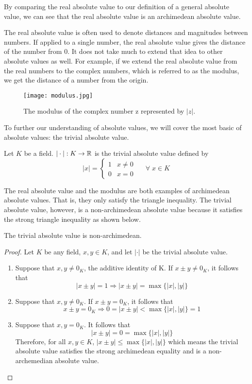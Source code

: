 \documentclass[a4paper]{article}
\begin{document}
By comparing the real absolute value to our definition of a general
absolute value, we can see that the real absolute value is an
archimedean absolute value.

The real absolute value is often used to denote distances 
and magnitudes between numbers.  If applied to a single number, the
real absolute value gives the distance of the number from 0.  
It does not take much to extend
that idea to other absolute values as well.  For example, if we extend
the real absolute value from the real numbers to the
complex numbers, which is referred to as the modulus,
we get the distance of a number from the origin.

\begin{figure}[!h]
  \centering
  \texttt{[image: modulus.jpg]}
  \caption{\label{fig:modulus}The modulus of the complex number z
  represented by \(|z|\).}
\end{figure}

To further our understanding of absolute values, we will cover the most
basic of absolute values: the trivial absolute value.

\begin{definition}
Let \(K\) be a field.  \(|\cdot|:K\to\mathbb R\) is the trivial 
absolute value defined by
\[
  |x|=
  \begin{cases} 
      1 & x\neq 0 \\
      0 & x=0 
   \end{cases}\;\;\;\;\;
   \forall\;x\in K
\]
\end{definition}

The real absolute value and the modulus are both examples
of archimedean absolute values.  That is, they only satisfy the triangle 
inequality. The trivial absolute value, however, is a non-archimedean
absolute value because it satisfies the strong triangle inequality as
shown below.

\begin{theorem}
  The trivial absolute value is non-archimedean.
\end{theorem}
\begin{proof}
  Let \(K\) be any field, \(x,y\in K\), and let \(|\cdot|\) be the 
  trivial absolute value.
  \begin{enumerate}
  \item Suppose that \(x,y\neq0_K\), the additive identity of K. 
  If \(x\pm y\neq 0_K\), it follows that
  \[
  	|x\pm y|=1\Rightarrow |x\pm y|=\max\{|x|,|y|\}
  \]
  \item Suppose that \(x,y\neq0_K\).
  If \(x\pm y=0_K\), it follows that
  \[
  	x\pm y=0_K\Rightarrow 0=|x\pm y|<\max\{|x|,|y|\}=1
  \]
  \item Suppose that \(x,y=0_K\).  It follows that
  \[
  	|x\pm y|=0=\max\{|x|,|y|\}
  \]
  Therefore, for all \(x,y\in K\), \(|x\pm y|\leq\max\{|x|,|y|\}\)
  which means the trivial absolute value satisfies the strong
  archimedean equality and is a non-archemedian absolute value.
\end{enumerate}
\end{proof}
\end{document}
